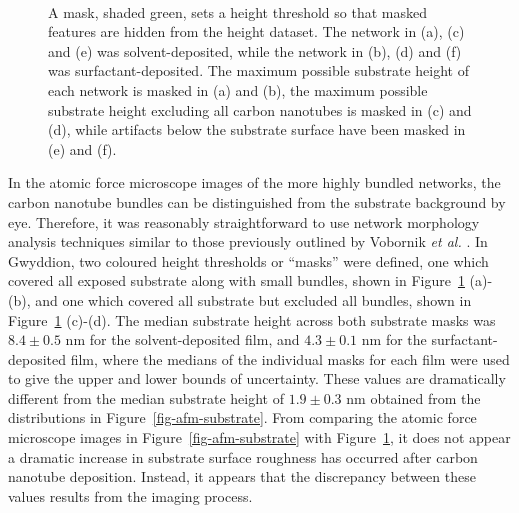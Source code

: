 \documentclass[
  a4paper,
]{scrbook}
\begin{document}
\begin{figure}
\begin{minipage}[t]{0.01\linewidth}
{\centering 

~

}

\end{minipage}%

\caption[Atomic force microscope images which have been masked
(highlighted green) below various threshold
heights.]{\label{fig-cnt-mask}A mask, shaded green, sets a height
threshold so that masked features are hidden from the height dataset.
The network in (a), (c) and (e) was solvent-deposited, while the network
in (b), (d) and (f) was surfactant-deposited. The maximum possible
substrate height of each network is masked in (a) and (b), the maximum
possible substrate height excluding all carbon nanotubes is masked in
(c) and (d), while artifacts below the substrate surface have been
masked in (e) and (f).}

\end{figure}

In the atomic force microscope images of the more highly bundled
networks, the carbon nanotube bundles can be distinguished from the
substrate background by eye. Therefore, it was reasonably
straightforward to use network morphology analysis techniques similar to
those previously outlined by Vobornik \emph{et al.}
\autocite{Vobornik2023}. In Gwyddion, two coloured height thresholds or
``masks'' were defined, one which covered all exposed substrate along
with small bundles, shown in Figure~\ref{fig-cnt-mask} (a)-(b), and one
which covered all substrate but excluded all bundles, shown in
Figure~\ref{fig-cnt-mask} (c)-(d). The median substrate height across
both substrate masks was \(8.4 \pm 0.5\) nm for the solvent-deposited
film, and \(4.3 \pm 0.1\) nm for the surfactant-deposited film, where
the medians of the individual masks for each film were used to give the
upper and lower bounds of uncertainty. These values are dramatically
different from the median substrate height of \(1.9 \pm 0.3\) nm
obtained from the distributions in Figure~\ref{fig-afm-substrate}. From
comparing the atomic force microscope images in
Figure~\ref{fig-afm-substrate} with Figure~\ref{fig-cnt-mask}, it does
not appear a dramatic increase in substrate surface roughness has
occurred after carbon nanotube deposition. Instead, it appears that the
discrepancy between these values results from the imaging process.
\end{document}
